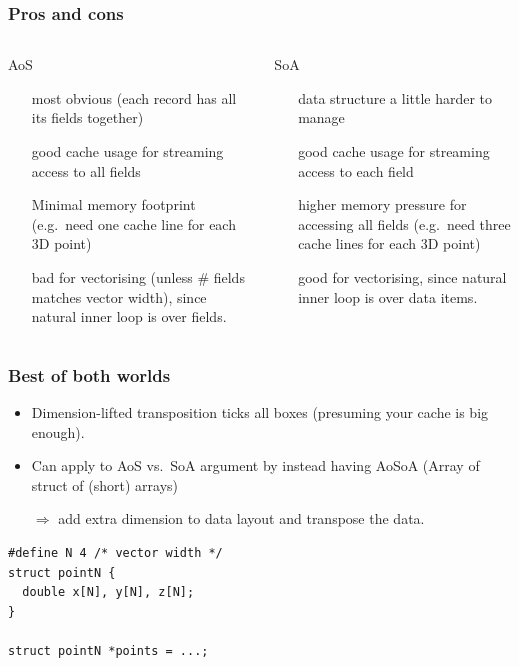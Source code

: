 \documentclass[presentation,aspectratio=43,10pt]{beamer}
\begin{document}
\begin{frame}
  \frametitle{Pros and cons}
  \begin{columns}
    \begin{column}{0.5\textwidth}
      \begin{block}{AoS}
        \begin{itemize}
        \item[\cmark] most obvious (each record has all its fields
          together)
        \item[\cmark] good cache usage for streaming access to all
          fields
        \item[\cmark] Minimal memory footprint (e.g.~need one cache line for each 3D point)
        \item[\xmark] bad for vectorising (unless \# fields matches
          vector width), since natural inner loop is over fields.
        \end{itemize}
      \end{block}
    \end{column}
    \begin{column}{0.5\textwidth}
      \begin{block}{SoA}
        \begin{itemize}
        \item[\xmark] data structure a little harder to manage
        \item[\cmark] good cache usage for streaming access to each
          field
        \item[\xmark] higher memory pressure for accessing all fields
          (e.g.~need three cache lines for each 3D point)
        \item[\cmark] good for vectorising, since natural inner loop
          is over data items.
        \end{itemize}
      \end{block}
    \end{column}
  \end{columns}
\end{frame}

\begin{frame}[fragile]
  \frametitle{Best of both worlds}
  \begin{itemize}
  \item Dimension-lifted transposition ticks all boxes (presuming your
    cache is big enough).
  \item Can apply to AoS vs.~SoA argument by instead having AoSoA
    (Array of struct of (short) arrays)
  \item[$\Rightarrow$] add extra dimension to data layout and
    transpose the data.
  \end{itemize}
\begin{verbatim}
#define N 4 /* vector width */
struct pointN {
  double x[N], y[N], z[N];
}

struct pointN *points = ...;
\end{verbatim}
\end{frame}
\end{document}
